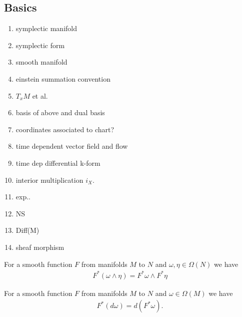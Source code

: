 \begin{appendix}

\section{Basics}

\begin{enumerate}
\item symplectic manifold
\item symplectic form
\item smooth manifold
\item einstein summation convention
\item $T_x M$ et al.
\item basis of above and dual basis
\item coordinates associated to chart?
\item time dependent vector field and flow
\item time dep differential k-form
\item interior multiplication $i_X$.
\item exp..
\item NS
\item Diff(M)
\item sheaf morphism
\end{enumerate}


\begin{lemma}[refyan E.]
For a smooth function $F$ from manifolds $M$ to $N$ and $\omega,\eta \in \Omega(N)$ we have
\begin{align*}
F^*(\omega \wedge \eta) = F^* \omega \wedge F^* \eta
\end{align*}
\end{lemma}

\begin{lemma}[refyan E.203]
For a smooth function $F$ from manifolds $M$ to $N$ and $\omega \in \Omega(M)$ we have
\begin{align*}
F^*(d\omega) = d(F^* \omega).
\end{align*}
\end{lemma}


\end{appendix}

